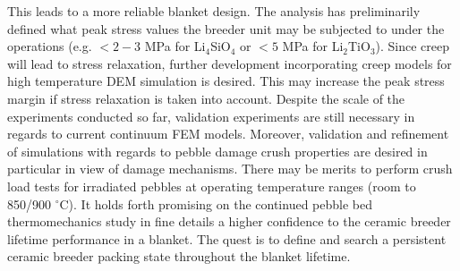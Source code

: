 This leads to a more reliable blanket design. The analysis has preliminarily defined what peak stress values the breeder unit may be subjected to under the operations (e.g. $< 2-3$ MPa for Li$_4$SiO$_4$ or $< 5$ MPa for Li$_2$TiO$_3$). Since creep will lead to stress relaxation, further development incorporating creep models for high temperature DEM simulation is desired. This may increase the peak stress margin if stress relaxation is taken into account. Despite the scale of the experiments conducted so far, validation experiments are still necessary in regards to current continuum FEM models. Moreover, validation and refinement of simulations with regards to pebble damage crush properties are desired in particular in view of damage mechanisms.  There may be merits to perform crush load tests for irradiated pebbles at operating temperature ranges (room to 850/900 $^\circ$C). It holds forth promising on the continued pebble bed thermomechanics study in fine details a higher confidence to the ceramic breeder lifetime performance in a blanket.  The quest is to define and search a persistent ceramic breeder packing state throughout the blanket lifetime. 
